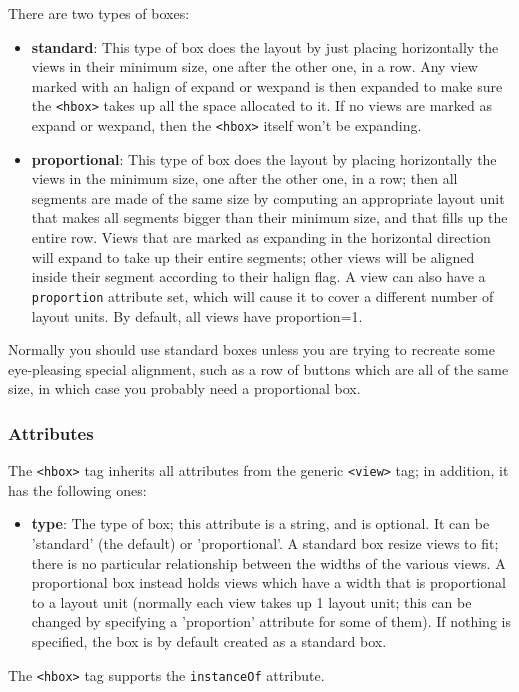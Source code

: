 There are two types of boxes:
\begin{itemize}
\item {\bf standard}: This type of box does the layout by just placing
  horizontally the views in their minimum size, one after the other
  one, in a row.  Any view marked with an halign of expand or wexpand
  is then expanded to make sure the \texttt{<hbox>} takes up all the
  space allocated to it.  If no views are marked as expand or wexpand,
  then the \texttt{<hbox>} itself won't be expanding.
\item {\bf proportional}: This type of box does the layout by placing
  horizontally the views in the minimum size, one after the other one,
  in a row; then all segments are made of the same size by computing
  an appropriate layout unit that makes all segments bigger than their
  minimum size, and that fills up the entire row.  Views that are
  marked as expanding in the horizontal direction will expand to take
  up their entire segments; other views will be aligned inside their
  segment according to their halign flag.  A view can also have a
  \texttt{proportion} attribute set, which will cause it to cover a
  different number of layout units.  By default, all views have
  proportion=1.
\end{itemize}

Normally you should use standard boxes unless you are trying to
recreate some eye-pleasing special alignment, such as a row of buttons
which are all of the same size, in which case you probably need a
proportional box.

\subsubsection{Attributes}
The \texttt{<hbox>} tag inherits all attributes from the generic
\texttt{<view>} tag; in addition, it has the following ones:
\begin{itemize}
\item {\bf type}: The type of box; this attribute is a string, and is
  optional.  It can be 'standard' (the default) or 'proportional'.  A
  standard box resize views to fit; there is no particular
  relationship between the widths of the various views.  A
  proportional box instead holds views which have a width that is
  proportional to a layout unit (normally each view takes up 1 layout
  unit; this can be changed by specifying a 'proportion' attribute for
  some of them).  If nothing is specified, the box is by default
  created as a standard box.
\end{itemize}
The \texttt{<hbox>} tag supports the \texttt{instanceOf} attribute.

